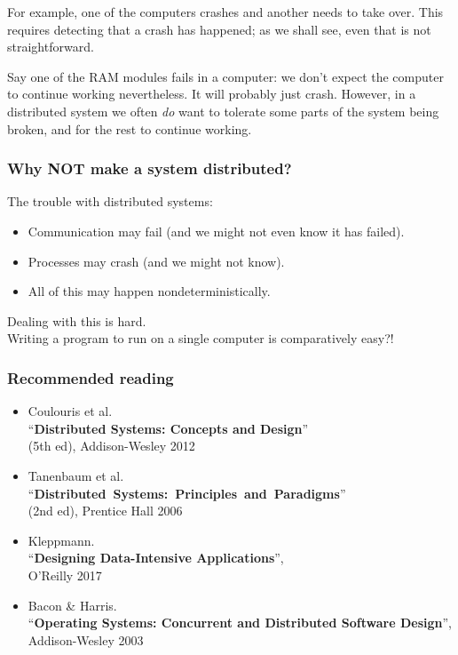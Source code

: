 For example, one of the computers crashes and another needs to take over.
This requires detecting that a crash has happened; as we shall see, even that is not straightforward.

Say one of the RAM modules fails in a computer: we don't expect the computer to continue working nevertheless.
It will probably just crash.
However, in a distributed system we often \emph{do} want to tolerate some parts of the system being broken, and for the rest to continue working.


\begin{frame}
    \label{s:why-not}
    \frametitle{Why NOT make a system distributed?}
    The trouble with distributed systems:
    \begin{itemize}
        \item Communication may fail (and we might not even know it has failed).
        \item Processes may crash (and we might not know).
        \item All of this may happen nondeterministically.
    \end{itemize}\vspace{1em}
    Dealing with this is hard.\\[1em]
    Writing a program to run on a single computer is comparatively easy?!
\end{frame}

\begin{frame}
    \label{s:reading}
    \frametitle{Recommended reading}
    \begin{itemize}
        \item Coulouris et al.\\ ``\textbf{Distributed Systems: Concepts and Design}''\\(5th ed), Addison-Wesley 2012
        \item Tanenbaum et al.\\ ``\textbf{Distributed Systems: Principles and Paradigms}''\\(2nd ed), Prentice Hall 2006 
        \item Kleppmann.\\ ``\textbf{Designing Data-Intensive Applications}'',\\O’Reilly 2017
        \item Bacon \& Harris.\\ ``\textbf{Operating Systems: Concurrent and Distributed Software Design}'', Addison-Wesley 2003
    \end{itemize}
\end{frame}

